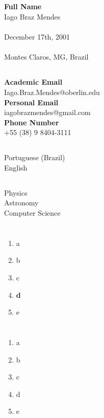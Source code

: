 \documentclass{cv}
\begin{document}
    \firstsection
        {}
        {
            \subsection*{}
                \textbf{Full Name} \\ Iago Braz Mendes \\
                \faCalendar \\ December 17th, 2001 \\
                \faHome \\ Montes Claros, MG, Brazil
        }
        {
            \subsection*{}
                \textbf{Academic Email} \\ {\footnotesize Iago.Braz.Mendes@oberlin.edu} \\
                \textbf{Personal Email} \\ {\footnotesize iagobrazmendes@gmail.com} \\
                \textbf{Phone Number} \\ +55 (38) 9 8404-3111
        }
        {
            \subsection*{}
                Portuguese (Brazil) \\ English
            \subsection*{}
                Physics \\ Astronomy \\ Computer Science
        }
    \section*{}
        \begin{enumerate}
            \item a
            \item b
            \item c
            \item \textbf{d}
            \item e
        \end{enumerate}
    \section*{}
        \begin{enumerate}
            \item a
            \item b
            \item c
            \item d
            \item e
        \end{enumerate}
\end{document}
